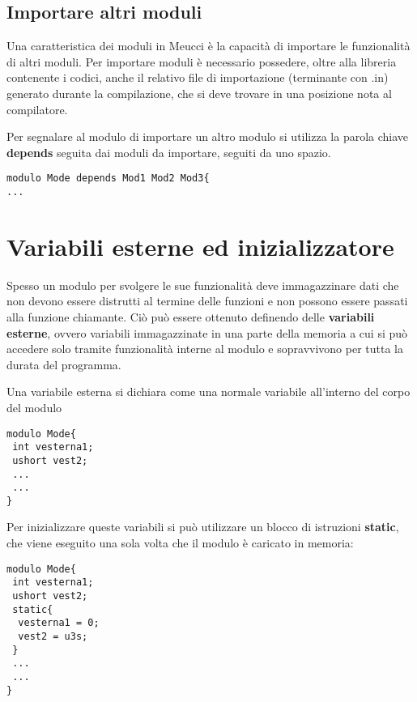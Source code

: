 \documentclass[10pt]{book}%
\newcommand{\e}{\`{e} }
\newcommand{\ac}[1]{\`{#1}}
\renewcommand{\emph}[1]{\textbf{#1}}
\newenvironment{codeenv}{
\begin{mdframed}[backgroundcolor=black!20,topline=false,leftline=false,rightline=false,bottomline=false]
}
{\end{mdframed}}
\begin{document}
\subsection{Importare altri moduli}
Una caratteristica dei moduli in Meucci \e la capacit\ac a di importare le funzionalit\ac a di altri moduli. Per importare moduli \e necessario possedere, oltre alla libreria contenente i codici, anche il relativo file di importazione (terminante con .in) generato durante la compilazione, che si deve trovare in una posizione nota al compilatore.

Per segnalare al modulo di importare un altro modulo si utilizza la parola chiave \emph{depends} seguita dai moduli da importare, seguiti da uno spazio.
\begin{codeenv}
\begin{verbatim}
modulo Mode depends Mod1 Mod2 Mod3{
...
\end{verbatim}
\end{codeenv}

\section{Variabili esterne ed inizializzatore}
Spesso un modulo per svolgere le sue funzionalit\ac a deve immagazzinare dati che non devono essere distrutti al termine delle funzioni e non possono essere passati alla funzione chiamante. Ci\ac o pu\ac o essere ottenuto definendo delle \emph{variabili esterne}, ovvero variabili immagazzinate in una parte della memoria a cui si pu\ac o accedere solo tramite funzionalit\ac a interne al modulo e sopravvivono per tutta la durata del programma.

Una variabile esterna si dichiara come una normale variabile all'interno del corpo del modulo
\begin{codeenv}
\begin{verbatim}
modulo Mode{
 int vesterna1;
 ushort vest2;
 ...
 ...
}
\end{verbatim}
\end{codeenv}

Per inizializzare queste variabili si pu\ac o utilizzare un blocco di istruzioni \emph{static}, che viene eseguito una sola volta che il modulo \e caricato in memoria:
\begin{codeenv}
\begin{verbatim}
modulo Mode{
 int vesterna1;
 ushort vest2;
 static{
  vesterna1 = 0;
  vest2 = u3s;
 }
 ...
 ...
}
\end{verbatim}
\end{codeenv}
\end{document}
